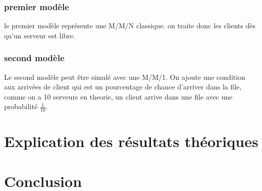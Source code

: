 \documentclass[a4paper,11pt]{article}
\begin{document}
	\subsubsection{premier modèle}
		le premier modèle représente une M/M/N classique. on traite donc les clients dès qu'un serveur est libre.
	\subsubsection{second modèle}
		Le second modèle peut être simulé avec une M/M/1. On ajoute une condition aux arrivées de client qui est un pourcentage de chance d'arriver dans la file, comme on a 10 serveurs en theorie, un client arrive dans une file avec une probabilité $\frac{1}{10}$.
	


\section{Explication des résultats théoriques}
	
\section{Conclusion}
	
\end{document}
